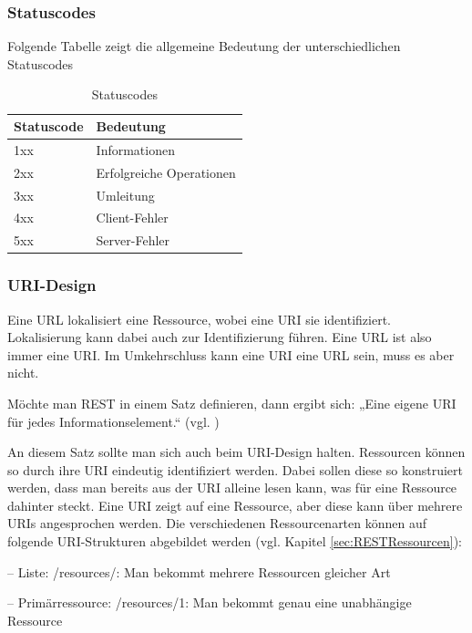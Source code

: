 \subsubsection{Statuscodes}
\label{sec:RESTStatuscodes}

Folgende Tabelle zeigt die allgemeine Bedeutung der unterschiedlichen Statuscodes

\begin{table}[!h]
	\begin{tabular}{ | l | l | }
		\hline
		Statuscode & Bedeutung \\ \hline
		1xx & Informationen \\ \hline
		2xx & Erfolgreiche Operationen \\ \hline
		3xx & Umleitung \\ \hline
		4xx & Client-Fehler \\ \hline
		5xx & Server-Fehler \\ \hline
	\end{tabular}
	\caption{Statuscodes}
\end{table}


\subsubsection{URI-Design}
\label{sec:RESTURI-Design}

Eine \ac{URL} lokalisiert eine Ressource, wobei eine \ac{URI} sie identifiziert. Lokalisierung kann dabei auch zur Identifizierung führen.
Eine \ac{URL} ist also immer eine \ac{URI}. Im Umkehrschluss kann eine \ac{URI} eine \ac{URL} sein, muss es
aber nicht.

Möchte man \ac{REST} in einem Satz definieren, dann ergibt sich: „Eine eigene URI für jedes Informationselement.“ (vgl. \cite{.j}\cite{Tilkov.2015b})

An diesem Satz sollte man sich auch beim \ac{URI}-Design halten. Ressourcen können so durch
ihre \ac{URI} eindeutig identifiziert werden. Dabei sollen diese so konstruiert werden, dass man
bereits aus der \ac{URI} alleine lesen kann, was für eine Ressource dahinter steckt. Eine \ac{URI} zeigt
auf eine Ressource, aber diese kann über mehrere \ac{URI}s angesprochen werden.
Die verschiedenen Ressourcenarten können auf folgende \ac{URI}-Strukturen abgebildet werden (vgl. Kapitel \ref{sec:RESTRessourcen}): 

–	Liste: /resources/:	Man bekommt mehrere Ressourcen gleicher Art

–	Primärressource: /resources/1:	Man bekommt genau eine unabhängige Ressource

